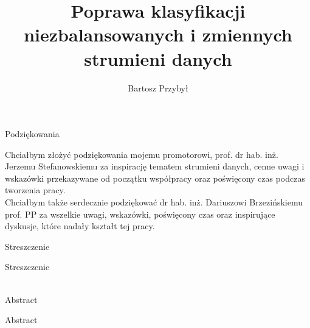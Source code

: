 \documentclass[polish,master,a4paper,oneside,11pt]{ppfcmthesis}
\author{%
   Bartosz Przybył \album{136785}}
\title{Poprawa klasyfikacji niezbalansowanych i zmiennych strumieni danych}
\begin{document}
\frontmatter\pagestyle{empty}%
\maketitle\cleardoublepage%

\newpage\null\thispagestyle{empty}\newpage
\begin{center}
    \huge Podziękowania
\end{center}
Chciałbym złożyć podziękowania mojemu promotorowi, prof. dr hab. inż. Jerzemu Stefanowskiemu za inspirację tematem strumieni danych, cenne uwagi i wskazówki przekazywane od początku współpracy oraz poświęcony czas podczas tworzenia pracy.\\

\noindent Chciałbym także serdecznie podziękować dr hab. inż. Dariuszowi Brzezińskiemu prof. PP za wszelkie uwagi, wskazówki, poświęcony czas oraz inspirujące dyskusje, które nadały kształt tej pracy.


\newpage\null\thispagestyle{empty}\newpage
\newpage
\begin{center}
    \huge Streszczenie
\end{center}
Streszczenie\\\\

\begin{center}
    \huge Abstract
\end{center}
Abstract

\newpage\null\thispagestyle{empty}\newpage
\newpage
{}\pagestyle{ppfcmthesis}%
\tableofcontents* 
\cleardoublepage %


\mainmatter%









{\raggedright\sloppy\small}


\cleardoublepage\appendix%
\newpage



\ppcolophon
\end{document}

